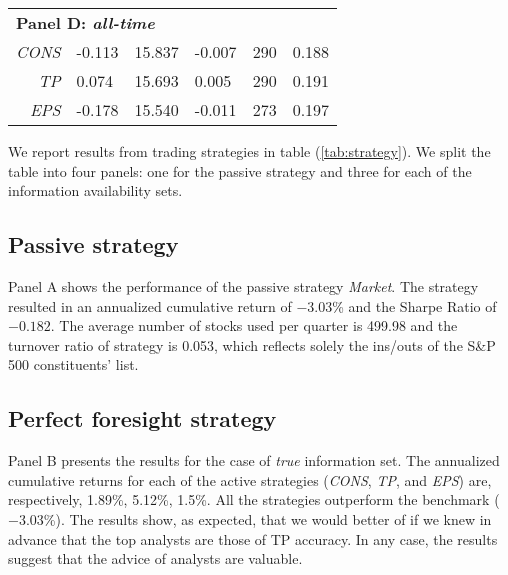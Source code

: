\documentclass{book}
\newcommand{\tr}{\textit{true}}
\newcommand{\default}{\textit{all-time}}
\begin{document}
\begin{table}
\begin{tabularx}{\linewidth}{r*{5}{Y}}
\end{tabularx}
\begin{tabularx}{\linewidth}{r*{5}{Y}}
  \multicolumn{5}{l}{\textbf{Panel D: \default{}}} \\
 \textit{CONS} & -0.113 & 15.837 & -0.007 &  290 & 0.188 \\ 
  \textit{TP} & 0.074 & 15.693 & 0.005 &  290 & 0.191 \\ 
  \textit{EPS} & -0.178 & 15.540 & -0.011 &  273 & 0.197 \\ 
  
\bottomrule
\end{tabularx}
\end{table}

We report results from trading strategies in table (\ref{tab:strategy}). We split the table into four panels: one for the passive strategy and three for each of the information availability sets. 

\subsection{Passive strategy}
Panel A shows  the performance of the passive strategy \textit{Market}. The strategy resulted in an annualized cumulative return of \ensuremath{-3.03}\% and the Sharpe Ratio  of \ensuremath{-0.182}. The average number of stocks used per quarter is 499.98 and the turnover ratio of strategy is 0.053, which reflects solely the ins/outs of the S\&P 500 constituents' list.

\subsection{Perfect foresight strategy}
\label{sec:perfect}
Panel B presents the results for the case of \tr{} information set. The annualized cumulative returns for each of the active strategies (\textit{CONS}, \textit{TP}, and \textit{EPS}) are, respectively, 1.89\%, 5.12\%, 1.5\%. All the strategies outperform the benchmark (\ensuremath{-3.03}\%). The results show, as expected, that  we would better of if we knew in advance that the top analysts are those of TP accuracy. In any case, the results suggest that the advice of analysts are valuable. 

\end{document}
